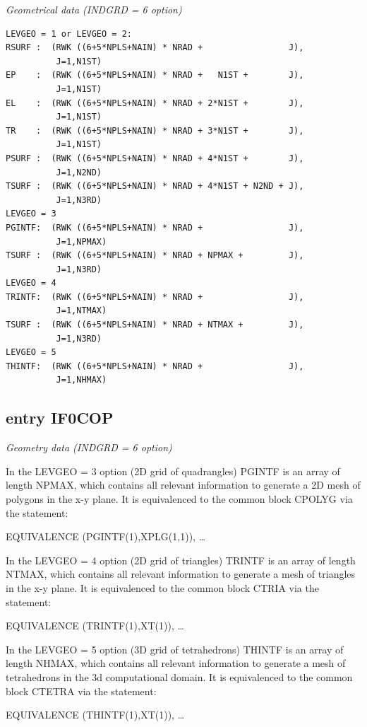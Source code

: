 \textsl{Geometrical data (INDGRD = 6 option)}

\begin{lstlisting}
LEVGEO = 1 or LEVGEO = 2:
RSURF :  (RWK ((6+5*NPLS+NAIN) * NRAD +                 J),
          J=1,N1ST)
EP    :  (RWK ((6+5*NPLS+NAIN) * NRAD +   N1ST +        J),
          J=1,N1ST)
EL    :  (RWK ((6+5*NPLS+NAIN) * NRAD + 2*N1ST +        J),
          J=1,N1ST)
TR    :  (RWK ((6+5*NPLS+NAIN) * NRAD + 3*N1ST +        J),
          J=1,N1ST)
PSURF :  (RWK ((6+5*NPLS+NAIN) * NRAD + 4*N1ST +        J),
          J=1,N2ND)
TSURF :  (RWK ((6+5*NPLS+NAIN) * NRAD + 4*N1ST + N2ND + J),
          J=1,N3RD)
LEVGEO = 3
PGINTF:  (RWK ((6+5*NPLS+NAIN) * NRAD +                 J),
          J=1,NPMAX)
TSURF :  (RWK ((6+5*NPLS+NAIN) * NRAD + NPMAX +         J),
          J=1,N3RD)
LEVGEO = 4
TRINTF:  (RWK ((6+5*NPLS+NAIN) * NRAD +                 J),
          J=1,NTMAX)
TSURF :  (RWK ((6+5*NPLS+NAIN) * NRAD + NTMAX +         J),
          J=1,N3RD)
LEVGEO = 5
THINTF:  (RWK ((6+5*NPLS+NAIN) * NRAD +                 J),
          J=1,NHMAX)
\end{lstlisting}

\subsection{entry IF0COP} \label{sec4.1.0}

\textsl{Geometry data (INDGRD = 6 option)}

\medskip

In the LEVGEO = 3 option (2D grid of quadrangles) PGINTF is an array of length
NPMAX, which contains all relevant information to generate a 2D mesh of
polygons in the x-y plane.
It is equivalenced to the common block CPOLYG via the statement:

EQUIVALENCE (PGINTF(1),XPLG(1,1)), \dots 

In the LEVGEO = 4 option (2D grid of triangles) TRINTF is an array of length
NTMAX, which contains all relevant information to generate a mesh of triangles
in the x-y plane.
It is equivalenced to the common block CTRIA via the statement:

EQUIVALENCE (TRINTF(1),XT(1)), \dots 

In the LEVGEO = 5 option (3D grid of tetrahedrons) THINTF is an array of length
NHMAX, which contains all relevant information to generate a mesh of
tetrahedrons in the 3d computational domain.
It is equivalenced to the common block CTETRA via the statement:

EQUIVALENCE (THINTF(1),XT(1)), \dots 

